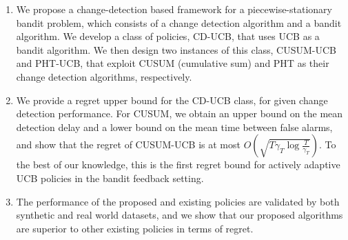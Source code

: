 \documentclass[letterpaper]{article} %
\begin{document}
\begin{enumerate}
 \item We propose a change-detection based framework for a piecewise-stationary bandit problem, which consists of a change detection algorithm and a bandit algorithm. We develop a class of policies, CD-UCB, that uses UCB as a bandit algorithm. We then design two instances of this class, CUSUM-UCB and PHT-UCB, that exploit CUSUM (cumulative sum) and PHT as their change detection algorithms, respectively.
 \vspace{-5pt}
 \item 
We provide a regret upper bound for the CD-UCB class, for given change detection performance. For CUSUM, we obtain an upper bound on the mean detection delay and a lower bound on the mean time between false alarms, and show that the regret of CUSUM-UCB is at most $O(\sqrt{T\gamma_T\log{\frac{T}{\gamma_T}}})$. To the best of our knowledge, this is the first regret bound for actively adaptive UCB policies in the bandit feedback setting.
 \vspace{-5pt}
 \item 
The performance of the proposed and existing policies are validated by both synthetic and real world datasets, and we show that our proposed algorithms are superior to other existing policies in terms of regret.
 \end{enumerate}
\end{document}
